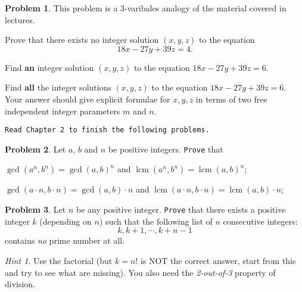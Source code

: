 \documentclass[11pt]{article}
\theoremstyle{plain}
\theoremstyle{definition}
\newtheorem{problem}{Problem}
\theoremstyle{remark}
\newtheorem*{hint}{Hint}
\numberwithin{equation}{problem}
\DeclareMathOperator*\lcm{lcm}
\begin{document}
\begin{problem}
	This problem is a $3$-varibales analogy of the material covered in lectures.
	\begin{listinprob}
		\item Prove that there exists no integer solution $(x, y, z)$ to the equation 
		\[
			18x - 27y + 39z = 4.
		\]
		\item Find \textbf{an} integer solution $(x, y, z)$ to the equation $18x - 27y + 39z = 6$. 
		\item Find \textbf{all} the integer solutions $(x, y, z)$ to the equation $18x - 27y + 39z = 6$. 
		Your answer should give explicit formulae for $x, y, z$ in terms of two free independent integer parameters $m$ and $n$.
	\end{listinprob}
\end{problem}
\vspace*{1em}

\begin{center}
	\texttt{Read Chapter 2 to finish the following problems.}
\end{center}

\begin{problem}
	Let $a$, $b$ and $n$ be positive integers. \texttt{Prove} that 
	\begin{listinprob}
		\item $\gcd(a^n,b^n) = \gcd(a,b)^n$ and $\lcm(a^n,b^n) = \lcm(a,b)^n$;
		\item $\gcd(a\cdot n,b\cdot n) = \gcd(a,b)\cdot n$ and $\lcm(a\cdot n,b\cdot n) = \lcm(a,b)\cdot n$;
	\end{listinprob}
\end{problem}
\vspace*{1em}

\begin{problem}
	Let $n$ be any positive integer. \texttt{Prove} that there exists a positive integer $k$ (depending on $n$) such that the following list of $n$ consecutive integers:
	\[
		k, k + 1, \cdots, k + n - 1
	\]
	contains \emph{no} prime number at all.
	\begin{hint}
		Use the factorial (but $k=n!$ is NOT the correct answer, start from this and try to see what are missing). You also need the \emph{2-out-of-3} property of division.
	\end{hint}
\end{problem}
\end{document}
